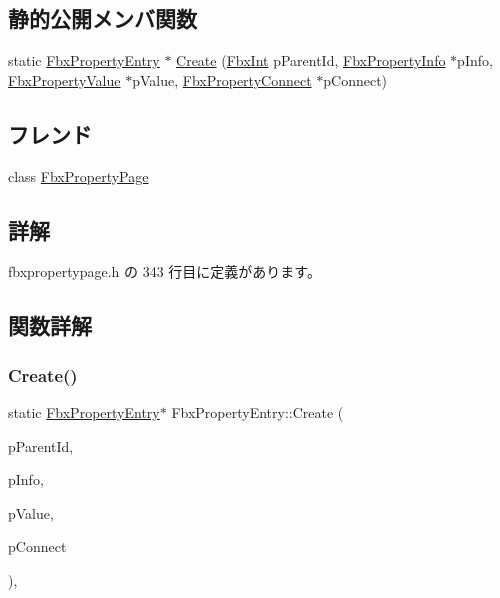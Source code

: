 \subsection*{静的公開メンバ関数}
\begin{DoxyCompactItemize}
\item 
static \hyperlink{class_fbx_property_entry}{Fbx\+Property\+Entry} $\ast$ \hyperlink{class_fbx_property_entry_a7bdf080b6151e2cf42444c207cdd454b}{Create} (\hyperlink{fbxtypes_8h_a088fa96de3b0b3ea69f0f6afef525dfb}{Fbx\+Int} p\+Parent\+Id, \hyperlink{class_fbx_property_info}{Fbx\+Property\+Info} $\ast$p\+Info, \hyperlink{class_fbx_property_value}{Fbx\+Property\+Value} $\ast$p\+Value, \hyperlink{class_fbx_property_connect}{Fbx\+Property\+Connect} $\ast$p\+Connect)
\end{DoxyCompactItemize}
\subsection*{フレンド}
\begin{DoxyCompactItemize}
\item 
class \hyperlink{class_fbx_property_entry_ad8065889ce44304e7cc811caf583781e}{Fbx\+Property\+Page}
\end{DoxyCompactItemize}


\subsection{詳解}


 fbxpropertypage.\+h の 343 行目に定義があります。



\subsection{関数詳解}
\mbox{\label{class_fbx_property_entry_a7bdf080b6151e2cf42444c207cdd454b}} 
\subsubsection{\texorpdfstring{Create()}{Create()}}
{\footnotesize\ttfamily static \hyperlink{class_fbx_property_entry}{Fbx\+Property\+Entry}$\ast$ Fbx\+Property\+Entry\+::\+Create (\begin{DoxyParamCaption}\item[{\hyperlink{fbxtypes_8h_a088fa96de3b0b3ea69f0f6afef525dfb}{Fbx\+Int}}]{p\+Parent\+Id,  }\item[{\hyperlink{class_fbx_property_info}{Fbx\+Property\+Info} $\ast$}]{p\+Info,  }\item[{\hyperlink{class_fbx_property_value}{Fbx\+Property\+Value} $\ast$}]{p\+Value,  }\item[{\hyperlink{class_fbx_property_connect}{Fbx\+Property\+Connect} $\ast$}]{p\+Connect }\end{DoxyParamCaption})\hspace{0.3cm}{\ttfamily [inline]}, {\ttfamily [static]}}



